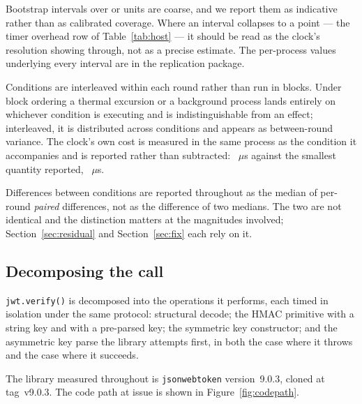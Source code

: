 \documentclass[pdflatex,sn-basic,twocolumn]{sn-jnl}%
\newcommand{\LibraryName}{\texttt{jsonwebtoken}}
\newcommand{\LibraryVersion}{version~9.0.3} %
\newcommand{\LibraryTag}{tag~v9.0.3} %
\begin{document}
Bootstrap intervals over \HostInvocations{} or \MatrixInvocations{} units are
coarse, and we report them as indicative rather than as calibrated coverage.
Where an interval collapses to a point --- the timer overhead row of
Table~\ref{tab:host} --- it should be read as the clock's resolution showing
through, not as a precise estimate. The per-process values underlying every
interval are in the replication package.

Conditions are interleaved within each round rather than run in blocks. Under
block ordering a thermal excursion or a background process lands entirely on
whichever condition is executing and is indistinguishable from an effect;
interleaved, it is distributed across conditions and appears as between-round
variance. The clock's own cost is measured in the same process as the condition
it accompanies and is reported rather than subtracted: \HostTimerOverhead~$\mu$s
against the smallest quantity reported, \HostCreateSecretKey~$\mu$s.

Differences between conditions are reported throughout as the median of
per-round \emph{paired} differences, not as the difference of two medians. The
two are not identical and the distinction matters at the magnitudes involved;
Section~\ref{sec:residual} and Section~\ref{sec:fix} each rely on it.

\subsection{Decomposing the call}\label{sec:decompose}

\texttt{jwt.verify()} is decomposed into the operations it performs, each timed
in isolation under the same protocol: structural decode; the HMAC primitive with
a string key and with a pre-parsed key; the symmetric key constructor; and the
asymmetric key parse the library attempts first, in both the case where it
throws and the case where it succeeds.

The library measured throughout is \LibraryName{} \LibraryVersion{}, cloned at
\LibraryTag. The code path at issue is shown in Figure~\ref{fig:codepath}.
\end{document}
